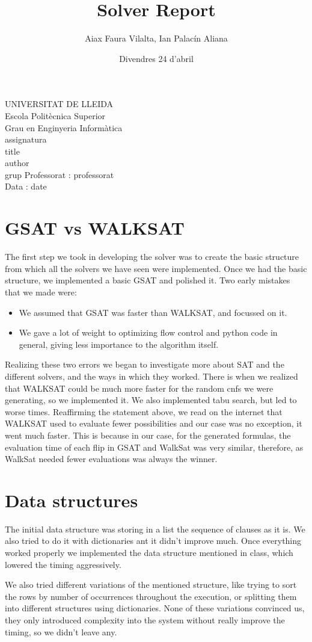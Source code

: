 \documentclass{article}
\title{Solver Report}
\author{Aiax Faura Vilalta, Ian Palacín Aliana}
\date{Divendres 24 d'abril}
\renewcommand{\maketitle}{ %
	\begin{titlepage}
		\raggedright{UNIVERSITAT DE LLEIDA \\
			Escola Politècnica Superior \\
			Grau en Enginyeria Informàtica\\
			\1assignatura\\}
		\vspace{5cm}
		\centering\huge{\5title \\}
		\vspace{3cm}
		\large{\6author} \\
		\normalsize{\3grup}
		\vfill
		Professorat : \4professorat \\
		Data : \7date
\end{titlepage}}
\begin{document}
	\maketitle
	\thispagestyle{empty}


\section{GSAT vs WALKSAT}
The first step we took in developing the solver was to create the basic structure
from which all the solvers we have seen were implemented.
Once we had the basic structure, we implemented a basic GSAT and polished it. Two early mistakes
that we made were:
\begin{itemize}
	\item We assumed that GSAT was faster than WALKSAT, and focussed on it.
	\item We gave a lot of weight to optimizing flow control and python code in general,
	giving less importance to the algorithm itself.
\end{itemize}
Realizing these two errors we began to investigate more about SAT and the different solvers,
and the ways in which they worked. There is when we realized that WALKSAT could be much more 
faster for the random cnfs we were generating, so we implemented it.
We also implemented tabu search, but led to worse times.  
Reaffirming the statement above, we read on the internet that WALKSAT used to evaluate fewer
possibilities and our case was no exception, it went much faster. This is because in our case,
for the generated formulas, the evaluation time of each flip in GSAT and WalkSat was very similar,
therefore, as WalkSat needed fewer evaluations was always the winner.



\section{Data structures}
The initial data structure was storing in a list the sequence of clauses as it is. We also tried to 
do it with dictionaries ant it didn't improve much.
Once everything worked properly we implemented the data structure mentioned in class, which 
lowered the timing aggressively.

We also tried different variations of the mentioned structure, like trying to sort the rows by
number of occurrences throughout the execution, or splitting them into different structures 
using dictionaries. None of these variations convinced us, they only introduced complexity 
into the system without really improve the timing, so we didn't leave any.
\end{document}
